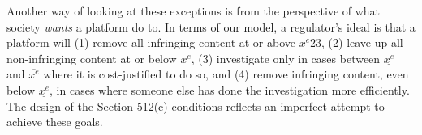 Another way of looking at these exceptions is from the perspective of what society \emph{wants} a platform do to. In terms of our model, a regulator's ideal is that a platform will (1) remove all infringing content at or above $\underline{x^e}23$, (2) leave up all non-infringing content at or below $\overline{x^e}$, (3) investigate only in cases between $\underline{x^e}$ and $\overline{x^e}$ where it is cost-justified to do so, and (4) remove infringing content, even below $\underline{x^e}$, in cases where someone else has done the investigation more efficiently. The design of the Section 512(c) conditions reflects an imperfect attempt to achieve these goals.








